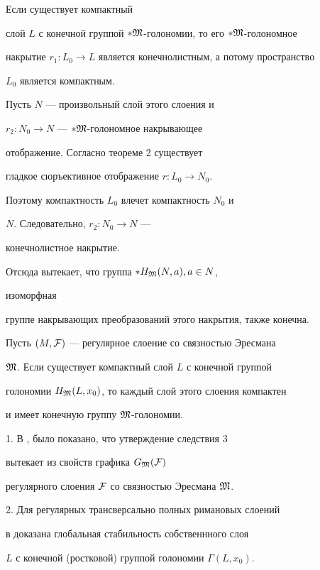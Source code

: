 \begin{pf}


Если существует компактный


слой $L$ с конечной группой $*\frak M$-голономии, то его  $*\frak M$-голономное


накрытие $r_1: L_0\to L$ является конечнолистным, а потому пространство


$L_0$ является компактным.


Пусть $N$ --- произвольный слой этого слоения и


$r_2: N_0\to N$ --- $*\frak M$-голономное накрывающее


отображение. Согласно теореме 2 существует


гладкое сюръективное отображение $r: L_0\to N_0$.


Поэтому компактность $L_0$ влечет компактность $N_0$ и


$N$. Следовательно, $r_2: N_0\to N$ ---


конечнолистное накрытие.


Отсюда вытекает, что группа  $*H_{\frak M}(N,a), a\in N$,


изоморфная


группе накрывающих преобразований этого накрытия, также конечна.


\end{pf}





\begin{cor}


Пусть $(M,\cal F)$ --- регулярное слоение со связностью Эресмана


$\frak M$. Если существует компактный слой $L$ с конечной группой


голономии $H_{\frak M}(L,x_0)$, то каждый слой этого слоения компактен


и имеет конечную группу $\frak M$-голономии.


\end{cor}





\begin{note}


1. В \cite{Z2}, \cite{Z3} было показано, что утверждение следствия 3


вытекает из свойств графика $G_{\frak M}(\cal F)$


регулярного слоения $\cal F$ со связностью Эресмана $\frak M$.





2. Для регулярных трансверсально полных римановых слоений


в \cite{Z4} доказана глобальная стабильность собственнного слоя


$L$ с конечной (ростковой) группой голономии $\Gamma (L, x_0)$.


\end{note}





